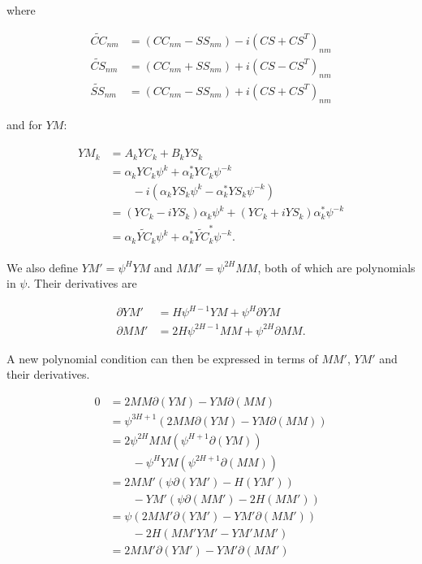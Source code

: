 \documentclass[apj]{emulateapj}
\newcommand{\YCt}{\widetilde{YC}}
\newcommand{\CCt}{\widetilde{CC}}
\newcommand{\CSt}{\widetilde{CS}}
\newcommand{\SSt}{\widetilde{SS}}
\newcommand{\eith}{\psi}
\begin{document}
where

\begin{align}
\CCt_{nm}  &= (CC_{nm} - SS_{nm}) - i\left(CS + CS^T\right)_{nm} \\
\CSt_{nm}  &= (CC_{nm} + SS_{nm}) + i\left(CS - CS^T\right)_{nm}\\
\SSt_{nm}  &= (CC_{nm} - SS_{nm}) + i\left(CS + CS^T\right)_{nm}
\end{align}

and for $YM$:

\begin{align}
\begin{split}
YM_{k} &= A_kYC_k + B_kYS_k\\
        &= \alpha_kYC_k\eith^k + \alpha_k^{*}YC_k\eith^{-k} \\
        &\qquad - i\left(\alpha_kYS_k\eith^k - \alpha^{*}_kYS_k\eith^{-k}\right)\\
        &= (YC_k - iYS_k)\alpha_k\eith^k + (YC_k + iYS_k)\alpha^{*}_k\eith^{-k}\\
        &= \alpha_k\YCt_k \eith^k + \alpha^{*}_k\YCt_k^{*} \eith^{-k}.
\end{split}
\end{align}


We also define $YM' = \eith^H YM$ and $MM' = \eith^{2H}MM$, both of which are polynomials in $\eith$. Their derivatives
are

\begin{align}
\partial YM' &= H\eith^{H-1} YM + \eith^H \partial YM\\
\partial MM' &= 2H\eith^{2H-1} MM + \eith^{2H}\partial MM.
\end{align}

A new polynomial condition can then be expressed in terms of $MM'$, $YM'$ and their derivatives.

\begin{align}\label{eq:finalpoly}
0 &= 2MM\partial(YM) - YM\partial(MM)\\
  &= \eith^{3H+1}\left(2MM\partial(YM) - YM\partial(MM)\right)\\
  &= 2\eith^{2H}MM\left(\eith^{H+1}\partial(YM)\right) \nonumber \\
  &\qquad - \eith^HYM\left(\eith^{2H+1}\partial(MM)\right)\\
  &= 2MM'\left(\eith\partial(YM') - H(YM')\right) \nonumber \\
  &\qquad - YM'\left(\eith\partial(MM') - 2H(MM')\right)\\
  &= \eith\left(2MM'\partial(YM') - YM'\partial(MM')\right) \nonumber \\
  &\qquad- 2H\left(MM'YM' - YM'MM'\right)\\
  &= 2MM'\partial(YM') - YM'\partial(MM')
\end{align}
\end{document}
